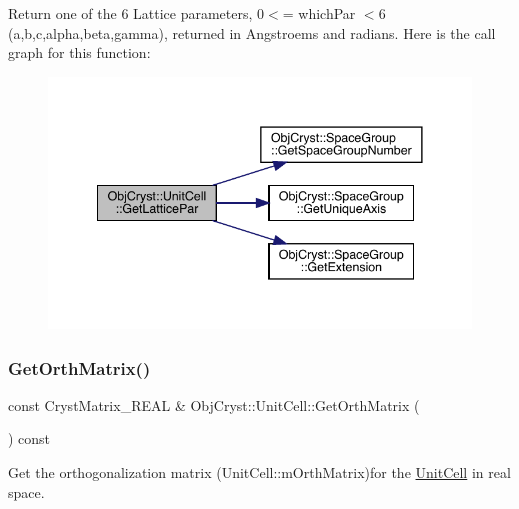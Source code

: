 Return one of the 6 Lattice parameters, 0$<$= which\+Par $<$6 (a,b,c,alpha,beta,gamma), returned in Angstroems and radians. Here is the call graph for this function\+:
\nopagebreak
\begin{figure}[H]
\begin{center}
\leavevmode
\includegraphics[width=341pt]{class_obj_cryst_1_1_unit_cell_a1f5687e68709cd764f12d4128c8b6492_cgraph}
\end{center}
\end{figure}
\mbox{\label{class_obj_cryst_1_1_unit_cell_ab043dec221c1a89228a46157cd4679a2}} 
\subsubsection{\texorpdfstring{GetOrthMatrix()}{GetOrthMatrix()}}
{\footnotesize\ttfamily const Cryst\+Matrix\+\_\+\+R\+E\+AL \& Obj\+Cryst\+::\+Unit\+Cell\+::\+Get\+Orth\+Matrix (\begin{DoxyParamCaption}{ }\end{DoxyParamCaption}) const}



Get the orthogonalization matrix (Unit\+Cell\+::m\+Orth\+Matrix)for the \mbox{\hyperlink{class_obj_cryst_1_1_unit_cell}{Unit\+Cell}} in real space. 

\mbox{\label{class_obj_cryst_1_1_unit_cell_a139524dca8d88544f6f2bf5ec4f1830a}} 
